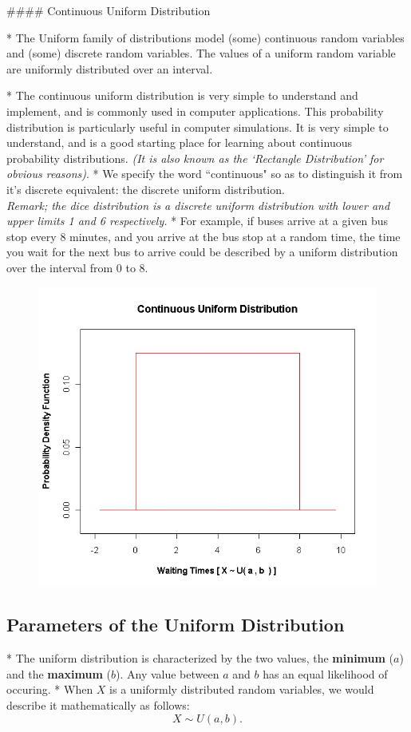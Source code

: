 \documentclass[a4paper,12pt]{article}
\begin{document}
#### Continuous Uniform Distribution 

*  
The Uniform family of distributions model (some) continuous random variables and (some) discrete random variables. The values of a uniform random variable are uniformly distributed over an interval. 

* The continuous uniform distribution is very simple to understand and implement, and is commonly used in computer applications. This probability distribution is particularly useful in computer simulations. It is very simple to understand, and is a good starting place for learning about continuous probability distributions.
\textit{(It is also known as the `Rectangle Distribution' for obvious reasons)}.
* We specify the word ``continuous" so as to distinguish it from it's discrete equivalent: the discrete uniform distribution.\\ \textit{Remark; the dice distribution is a discrete uniform distribution with lower and upper limits 1 and 6 respectively.}
* 
For example, if buses arrive at a given bus stop every 8 minutes, and you arrive at the bus stop at a random time, the time you wait for the 
next bus to arrive could be described by a uniform distribution over the interval from 0 to 8.



\begin{figure}[h!]
\centering
\includegraphics[width=0.5\linewidth]{images/6AUniform}
\caption{}
\label{fig:6AUniform}
\end{figure}


\subsection*{Parameters of the Uniform Distribution}


* The uniform distribution is characterized by the two values, the \textbf{minimum} ($a$) and the \textbf{maximum} ($b$). Any value between $a$ and $b$ has an equal likelihood of occuring.
* When $X$ is a uniformly distributed random variables, we would describe it mathematically as follows:
\[ X \sim U(a,b). \]
\end{document}
